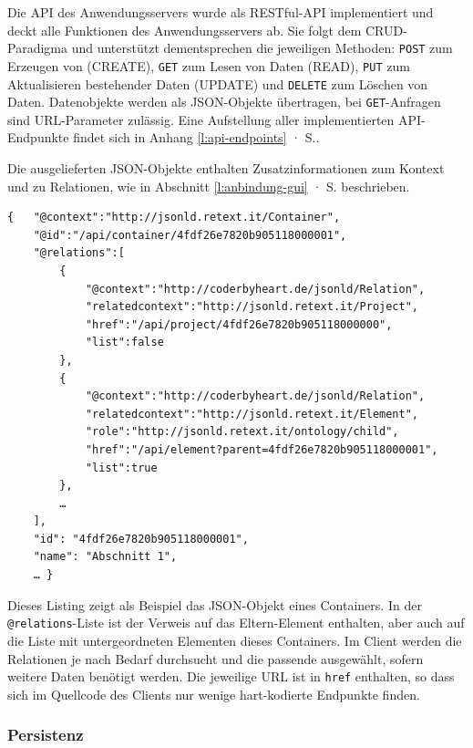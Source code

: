 Die API des Anwendungsservers wurde als RESTful-API implementiert und deckt alle Funktionen des Anwendungsservers ab. Sie folgt dem CRUD-Paradigma und unterstützt dementsprechen die jeweiligen Methoden: \texttt{POST} zum Erzeugen von (CREATE), \texttt{GET} zum Lesen von Daten (READ), \texttt{PUT} zum Aktualisieren bestehender Daten (UPDATE) und \texttt{DELETE} zum Löschen von Daten. Datenobjekte werden als JSON-Objekte übertragen, bei \texttt{GET}-Anfragen sind URL-Parameter zulässig. Eine Aufstellung aller implementierten API-Endpunkte findet sich in Anhang \ref{l:api-endpoints} · S.\pageref{l:api-endpoints}.

Die ausgelieferten JSON-Objekte enthalten Zusatzinformationen zum Kontext und zu Relationen, wie in Abschnitt \ref{l:anbindung-gui} · S.\pageref{l:anbindung-gui} beschrieben. 

\begin{samepage}
\begin{verbatim}
{   "@context":"http://jsonld.retext.it/Container",
    "@id":"/api/container/4fdf26e7820b905118000001",
    "@relations":[
        {
            "@context":"http://coderbyheart.de/jsonld/Relation",
            "relatedcontext":"http://jsonld.retext.it/Project",
            "href":"/api/project/4fdf26e7820b905118000000",
            "list":false
        },
        {
            "@context":"http://coderbyheart.de/jsonld/Relation",
            "relatedcontext":"http://jsonld.retext.it/Element",
            "role":"http://jsonld.retext.it/ontology/child",
            "href":"/api/element?parent=4fdf26e7820b905118000001",
            "list":true
        },
        …
    ],
    "id": "4fdf26e7820b905118000001",
    "name": "Abschnitt 1",
    … }
\end{verbatim}

Dieses Listing zeigt als Beispiel das JSON-Objekt eines Containers. In der \texttt{@relations}-Liste ist der Verweis auf das Eltern-Element enthalten, aber auch auf die Liste mit untergeordneten Elementen dieses Containers. Im Client werden die Relationen je nach Bedarf durchsucht und die passende ausgewählt, sofern weitere Daten benötigt werden. Die jeweilige URL ist in \texttt{href} enthalten, so dass sich im Quellcode des Clients nur wenige hart-kodierte Endpunkte finden.

\end{samepage}

\subsubsection{Persistenz}

